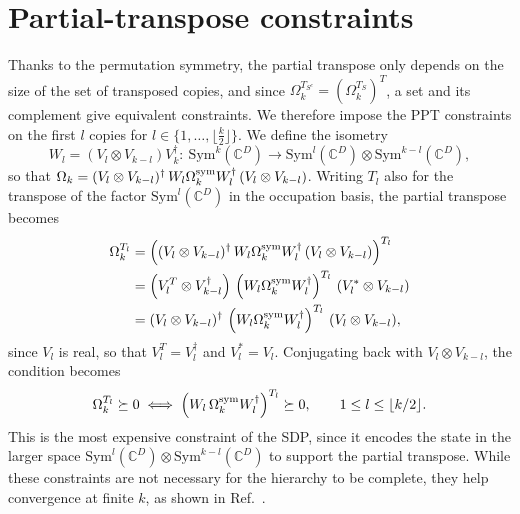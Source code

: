 \documentclass[11pt,a4paper]{report}
\newcommand{\C}{\mathds{C}}
\newcounter{reptag}
\newif\iftags \tagsfalse   %
\newcommand{\reptagbox}[3]{\iftags\par\smallskip\noindent\refstepcounter{reptag}%
  \fcolorbox{#1}{#1!7}{\parbox{\dimexpr\linewidth-2\fboxsep-2\fboxrule\relax}{\small
  \textcolor{#1}{\textbf{[\thereptag]\ #2.}}\ #3}}\par\smallskip\fi}
\newcommand{\detail}[1]{\reptagbox{tagD}{More detail}{#1}}
\begin{document}
\section{Partial-transpose constraints}
Thanks to the permutation symmetry, the partial transpose only depends on the size of the set of transposed copies, and since $\Omega_k^{T_{S^c}}=(\Omega_k^{T_S})^T$, a set and its complement give equivalent constraints. We therefore impose the PPT constraints on the first $l$ copies for $l \in \{1, \dots, \lfloor \tfrac{k}{2} \rfloor\}$. We define the isometry
\begin{equation}
    W_l=(V_l\otimes V_{k-l})V_k^\dagger:\ \text{Sym}^k(\C^D)\to\text{Sym}^l(\C^D)\otimes\text{Sym}^{k-l}(\C^D),
\end{equation}
so that $\Omega_k=(V_l\otimes V_{k-l})^\dagger\,W_l\Omega_k^{\rm sym}W_l^\dagger\,(V_l\otimes V_{k-l})$. Writing $T_l$ also for the transpose of the factor $\text{Sym}^l(\C^D)$ in the occupation basis, the partial transpose becomes
\begin{align}
    \Omega_k^{T_l} &= \left((V_l\otimes V_{k-l})^\dagger\,W_l\Omega_k^{\rm sym}W_l^\dagger\,(V_l\otimes V_{k-l})\right)^{T_l}\\
    &=\left(V_l^T\otimes V_{k-l}^\dagger\right)\,\left(W_l\Omega_k^{\rm sym}W_l^\dagger\right)^{T_l}\,\left(V_l^*\otimes V_{k-l}\right)\\
    &= (V_l\otimes V_{k-l})^\dagger\,\left(W_l\Omega_k^{\rm sym}W_l^\dagger\right)^{T_l}\,(V_l\otimes V_{k-l}),
\end{align}
since $V_l$ is real, so that $V_l^T=V_l^\dagger$ and $V_l^*=V_l$. Conjugating back with $V_l\otimes V_{k-l}$, the condition becomes
\begin{equation}
    \Omega_k^{T_l}\succeq0\iff\left(W_l\,\Omega_k^{\rm sym}W_l^\dagger\right)^{T_l}\succeq0,\qquad 1\leq l\leq\lfloor k/2\rfloor.
\end{equation}
This is the most expensive constraint of the SDP, since it encodes the state in the larger space $\text{Sym}^l(\C^D)\otimes\text{Sym}^{k-l}(\C^D)$ to support the partial transpose. While these constraints are not necessary for the hierarchy to be complete, they help convergence at finite $k$, as shown in Ref.~\cite{Navascues2009}.
\detail{Quantify what the PPT constraints cost and gain: bounds with and without them at the same level, and the size of the $\mathrm{Sym}^l\otimes\mathrm{Sym}^{k-l}$ blocks.}
\end{document}

